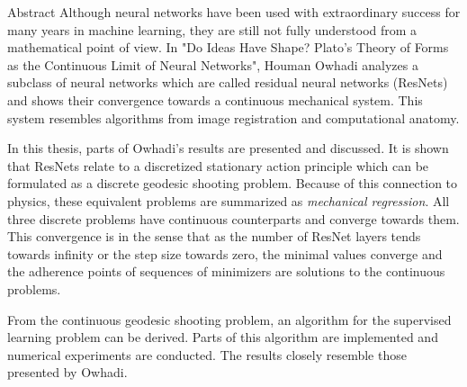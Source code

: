 \begin{polyabstract}{Abstract} 
	Although neural networks have been used with extraordinary success for many years in machine learning, they are still not fully understood from a mathematical point of view.
	In "Do Ideas Have Shape? Plato's Theory of Forms as the Continuous Limit of Neural Networks", Houman Owhadi analyzes a subclass of neural networks which are called residual neural networks (ResNets) and shows their convergence towards a continuous mechanical system.
	This system resembles algorithms from image registration and computational anatomy.
	
	In this thesis, parts of Owhadi's results are presented and discussed.
	It is shown that ResNets relate to a discretized stationary action principle which can be formulated as a discrete geodesic shooting problem.
	Because of this connection to physics, these equivalent problems are summarized as \emph{mechanical regression}.
	All three discrete problems have continuous counterparts and converge towards them.
	This convergence is in the sense that as the number of ResNet layers tends towards infinity or the step size towards zero, the minimal values converge and the adherence points of sequences of minimizers are solutions to the continuous problems.
	
	From the continuous geodesic shooting problem, an algorithm for the supervised learning problem can be derived.
	Parts of this algorithm are implemented and numerical experiments are conducted.
	The results closely resemble those presented by Owhadi.	
\end{polyabstract}

